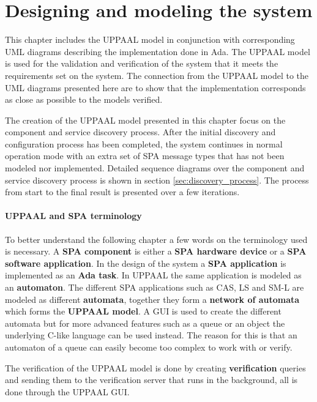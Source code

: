 \chapter{Designing and modeling the system}\label{ch:designing_and_modeling}
This chapter includes the UPPAAL model in conjunction with corresponding UML
diagrams describing the implementation done in Ada. The UPPAAL model is used
for the validation and verification of the system that it meets the
requirements set on the system. The connection from the UPPAAL model to the UML
diagrams presented here are to show that the implementation corresponds as
close as possible to the models verified.

The creation of the UPPAAL model presented in this chapter focus on the
component and service discovery process. After the initial discovery and
configuration process has been completed, the system continues in normal
operation mode with an extra set of SPA message types that has not been modeled
nor implemented. Detailed sequence diagrams over the component
and service discovery process is shown in section \ref{sec:discovery_process}.
The process from start to the final result is presented over a few iterations.

\subsubsection{UPPAAL and SPA terminology}
To better understand the following chapter a few words on the terminology used
is necessary. A \textbf{SPA component} is either a \textbf{SPA hardware
device} or a \textbf{SPA software application}. In the design of the system a
\textbf{SPA application} is implemented as an \textbf{Ada task}. In UPPAAL
the same application is modeled as an \textbf{automaton}. The different SPA
applications such as CAS, LS and SM-L are modeled as different
\textbf{automata}, together they form a \textbf{network of automata} which
forms the \textbf{UPPAAL model}. A GUI is used to create the different
automata but for more advanced features such as a queue or an object the
underlying C-like language can be used instead. The reason for this is that an
automaton of a queue can easily become too complex to work with or verify.

The verification of the UPPAAL model is done by creating \textbf{verification}
queries and sending them to the verification server that runs in the
background, all is done through the UPPAAL GUI.

